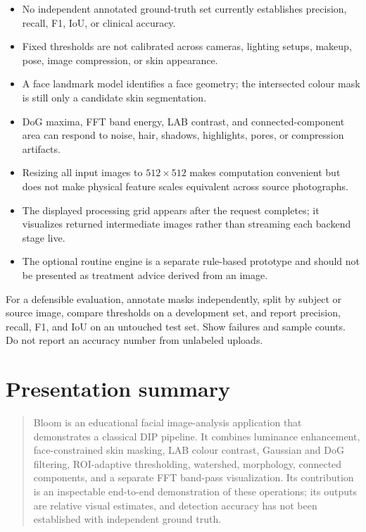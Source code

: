 \documentclass[11pt,a4paper]{article}
\begin{document}
\begin{itemize}
  \item No independent annotated ground-truth set currently establishes precision, recall, F1, IoU, or clinical accuracy.
  \item Fixed thresholds are not calibrated across cameras, lighting setups, makeup, pose, image compression, or skin appearance.
  \item A face landmark model identifies a face geometry; the intersected colour mask is still only a candidate skin segmentation.
  \item DoG maxima, FFT band energy, LAB contrast, and connected-component area can respond to noise, hair, shadows, highlights, pores, or compression artifacts.
  \item Resizing all input images to $512\times512$ makes computation convenient but does not make physical feature scales equivalent across source photographs.
  \item The displayed processing grid appears after the request completes; it visualizes returned intermediate images rather than streaming each backend stage live.
  \item The optional routine engine is a separate rule-based prototype and should not be presented as treatment advice derived from an image.
\end{itemize}

For a defensible evaluation, annotate masks independently, split by subject or source image, compare thresholds on a development set, and report precision, recall, F1, and IoU on an untouched test set. Show failures and sample counts. Do not report an accuracy number from unlabeled uploads.

\section{Presentation summary}

\begin{quote}
Bloom is an educational facial image-analysis application that demonstrates a classical DIP pipeline. It combines luminance enhancement, face-constrained skin masking, LAB colour contrast, Gaussian and DoG filtering, ROI-adaptive thresholding, watershed, morphology, connected components, and a separate FFT band-pass visualization. Its contribution is an inspectable end-to-end demonstration of these operations; its outputs are relative visual estimates, and detection accuracy has not been established with independent ground truth.
\end{quote}
\end{document}

